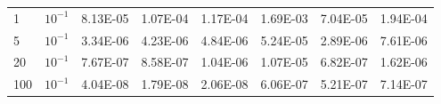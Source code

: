 \documentclass[mathserif, aspectratio=169]{beamer}
\newcommand{\diff}[1]{\, d#1}
\begin{document}
\begin{frame}
\begin{table}[!tbhp]
\begin{tabular}{|p{1cm}|p{1cm}|c|c|c|c|c|c|}
		  1   &	$10^{-1}$ &	8.13E-05 &	1.07E-04 &	1.17E-04 &	1.69E-03 &	7.04E-05 &	1.94E-04\\
		  5   &	$10^{-1}$ &	3.34E-06 &	4.23E-06 &	4.84E-06 &	5.24E-05 &	2.89E-06 &	7.61E-06\\
		  20  &	$10^{-1}$ &	7.67E-07 &	8.58E-07 &	1.04E-06 &	1.07E-05 &	6.82E-07 &	1.62E-06\\
		  100 &	$10^{-1}$ &	4.04E-08 &	1.79E-08 &	2.06E-08 &	6.06E-07 &	5.21E-07 &	7.14E-07\\
		  \hline
		\end{tabular}
	  \end{table}
\end{frame}
\end{document}
